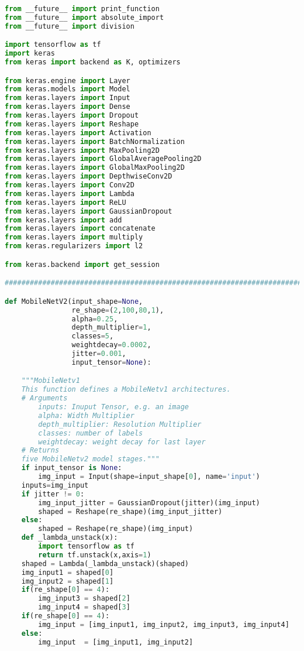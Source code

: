 \begin{lstlisting}[language=Python]
from __future__ import print_function
from __future__ import absolute_import
from __future__ import division

import tensorflow as tf
import keras
from keras import backend as K, optimizers

from keras.engine import Layer
from keras.models import Model
from keras.layers import Input
from keras.layers import Dense
from keras.layers import Dropout
from keras.layers import Reshape
from keras.layers import Activation
from keras.layers import BatchNormalization
from keras.layers import MaxPooling2D
from keras.layers import GlobalAveragePooling2D
from keras.layers import GlobalMaxPooling2D
from keras.layers import DepthwiseConv2D
from keras.layers import Conv2D
from keras.layers import Lambda
from keras.layers import ReLU
from keras.layers import GaussianDropout
from keras.layers import add
from keras.layers import concatenate
from keras.layers import multiply
from keras.regularizers import l2

from keras.backend import get_session

#############################################################################

def MobileNetV2(input_shape=None,
                re_shape=(2,100,80,1),
                alpha=0.25,
                depth_multiplier=1,
                classes=5,
                weightdecay=0.0002,
                jitter=0.001,
                input_tensor=None):

    """MobileNetv1
    This function defines a MobileNetv1 architectures.
    # Arguments
        inputs: Inuput Tensor, e.g. an image
        alpha: Width Multiplier
        depth_multiplier: Resolution Multiplier
        classes: number of labels
        weightdecay: weight decay for last layer
    # Returns
	five MobileNetv2 model stages."""
    if input_tensor is None:
        img_input = Input(shape=input_shape[0], name='input')
    inputs=img_input
    if jitter != 0:
        img_input_jitter = GaussianDropout(jitter)(img_input)
        shaped = Reshape(re_shape)(img_input_jitter)
    else:
        shaped = Reshape(re_shape)(img_input)
    def _lambda_unstack(x):
        import tensorflow as tf
        return tf.unstack(x,axis=1)
    shaped = Lambda(_lambda_unstack)(shaped)
    img_input1 = shaped[0]
    img_input2 = shaped[1]
    if(re_shape[0] == 4):
        img_input3 = shaped[2]
        img_input4 = shaped[3]
    if(re_shape[0] == 4):
        img_input = [img_input1, img_input2, img_input3, img_input4]
    else:
        img_input  = [img_input1, img_input2]


\end{lstlisting}
